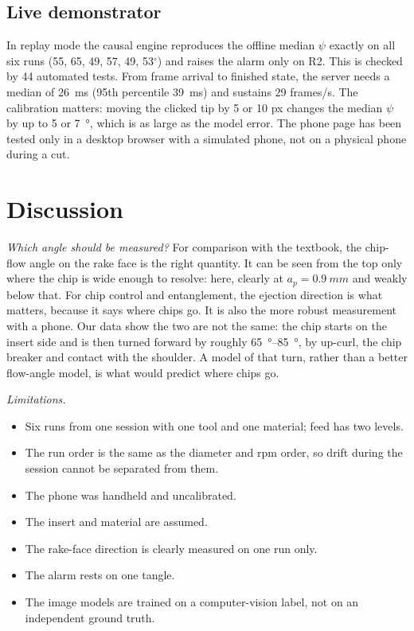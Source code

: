 \documentclass[conference,a4paper]{IEEEtran}
\newcommand{\degr}{\ensuremath{^\circ}}
\begin{document}
\subsection{Live demonstrator}
In replay mode the causal engine reproduces the offline median $\psi$ exactly on all six runs (55, 65, 49, 57, 49, 53\degr) and raises the alarm only on R2.
This is checked by 44 automated tests.
From frame arrival to finished state, the server needs a median of \SI{26}{ms} (95th percentile \SI{39}{ms}) and sustains 29 frames/s.
The calibration matters: moving the clicked tip by 5 or 10 px changes the median $\psi$ by up to 5 or \SI{7}{\degree}, which is as large as the model error.
The phone page has been tested only in a desktop browser with a simulated phone, not on a physical phone during a cut.

\section{Discussion}
\emph{Which angle should be measured?}
For comparison with the textbook, the chip-flow angle on the rake face is the right quantity.
It can be seen from the top only where the chip is wide enough to resolve: here, clearly at $a_p=\SI{0.9}{mm}$ and weakly below that.
For chip control and entanglement, the ejection direction is what matters, because it says where chips go.
It is also the more robust measurement with a phone.
Our data show the two are not the same: the chip starts on the insert side and is then turned forward by roughly \SIrange{65}{85}{\degree}, by up-curl, the chip breaker and contact with the shoulder.
A model of that turn, rather than a better flow-angle model, is what would predict where chips go.

\emph{Limitations.}
\begin{itemize}
\item Six runs from one session with one tool and one material; feed has two levels.
\item The run order is the same as the diameter and rpm order, so drift during the session cannot be separated from them.
\item The phone was handheld and uncalibrated.
\item The insert and material are assumed.
\item The rake-face direction is clearly measured on one run only.
\item The alarm rests on one tangle.
\item The image models are trained on a computer-vision label, not on an independent ground truth.
\end{itemize}
\end{document}
